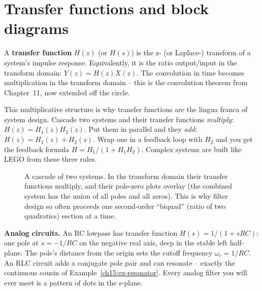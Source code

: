 \section{Transfer functions and block diagrams}
\label{ch15:transfer-functions}

A \textbf{transfer function} $H(z)$ (or $H(s)$) is the z- (or Laplace-) transform of a
system's impulse response. Equivalently, it is the ratio output/input in the transform
domain: $Y(z)=H(z)X(z)$. The convolution in time becomes multiplication in the transform
domain -- this is the convolution theorem from Chapter~11, now extended off the
circle.

This multiplicative structure is why transfer functions are the lingua franca of system
design. Cascade two systems and their transfer functions \emph{multiply}: $H(z)=H_1(z)
H_2(z)$. Put them in parallel and they \emph{add}: $H(z)=H_1(z)+H_2(z)$. Wrap one in a
feedback loop with $H_2$ and you get the feedback formula $H = H_1/(1+H_1 H_2)$. Complex
systems are built like LEGO from these three rules.

\begin{figure}[H]
\centering
{}
\caption{A cascade of two systems. In the transform domain their transfer functions
multiply, and their pole-zero plots overlay (the combined system has the union of
all poles and all zeros). This is why filter design so often proceeds one second-order
``biquad'' (ratio of two quadratics) section at a time.}
\label{ch15:fig-cascade}
\end{figure}

\begin{applicationbox}
\textbf{Analog circuits.} An RC lowpass has transfer function $H(s)=1/(1+sRC)$: one pole
at $s=-1/RC$ on the negative real axis, deep in the stable left half-plane. The pole's
distance from the origin sets the cutoff frequency $\omega_c=1/RC$. An RLC circuit adds a
conjugate pole pair and can resonate -- exactly the continuous cousin of
Example~\ref{ch15:ex-resonator}. Every analog filter you will ever meet is a pattern of
dots in the s-plane.
\end{applicationbox}

